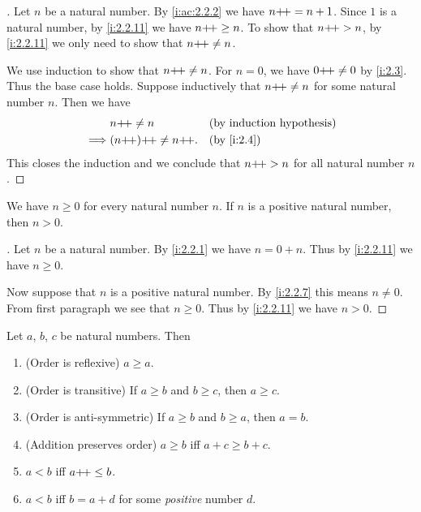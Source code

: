 \begin{proof}[]
  Let \(n\) be a natural number.
  By \cref{i:ac:2.2.2} we have \(n{+}\!{+} = n + 1\).
  Since \(1\) is a natural number, by \cref{i:2.2.11} we have \(n{+}\!{+} \geq n\).
  To show that \(n{+}\!{+} > n\), by \cref{i:2.2.11} we only need to show that \(n{+}\!{+} \neq n\).

  We use induction to show that \(n{+}\!{+} \neq n\).
  For \(n = 0\), we have \(0{+}\!{+} \neq 0\) by \cref{i:2.3}.
  Thus the base case holds.
  Suppose inductively that \(n{+}\!{+} \neq n\) for some natural number \(n\).
  Then we have
  \begin{align*}
             & n\pp \neq n          &  & \byIH      \\
    \implies & (n\pp)\pp \neq n\pp. &  & \by{i:2.4}
  \end{align*}
  This closes the induction and we conclude that \(n{+}\!{+} > n\) for all natural number \(n\).
\end{proof}

\begin{ac}\label{i:ac:2.2.4}
  We have \(n \geq 0\) for every natural number \(n\).
  If \(n\) is a positive natural number, then \(n > 0\).
\end{ac}

\begin{proof}[]
  Let \(n\) be a natural number.
  By \cref{i:2.2.1} we have \(n = 0 + n\).
  Thus by \cref{i:2.2.11} we have \(n \geq 0\).

  Now suppose that \(n\) is a positive natural number.
  By \cref{i:2.2.7} this means \(n \neq 0\).
  From first paragraph we see that \(n \geq 0\).
  Thus by \cref{i:2.2.11} we have \(n > 0\).
\end{proof}

\begin{prop}\label{i:2.2.12}
  Let \(a\), \(b\), \(c\) be natural numbers.
  Then
  \begin{enumerate}
    \item (Order is reflexive) \(a \geq a\).
    \item (Order is transitive) If \(a \geq b\) and \(b \geq c\), then \(a \geq c\).
    \item (Order is anti-symmetric) If \(a \geq b\) and \(b \geq a\), then \(a = b\).
    \item (Addition preserves order) \(a \geq b\) iff \(a + c \geq b + c\).
    \item \(a < b\) iff \(a{+}\!{+} \leq b\).
    \item \(a < b\) iff \(b = a + d\) for some \emph{positive} number \(d\).
  \end{enumerate}
\end{prop}

